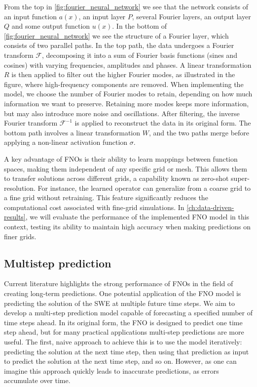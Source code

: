 From the top in \autoref{fig:fourier_neural_network} we see that the network consists of an input function $a(x)$, an input layer $P$, several Fourier layers, an output layer $Q$ and some output function $u(x)$.
In the bottom of \autoref{fig:fourier_neural_network} we see the structure of a Fourier layer, which consists of two parallel paths.
In the top path, the data undergoes a Fourier transform $\mathcal{F}$, decomposing it into a sum of Fourier basis functions (sines and cosines) with varying frequencies, amplitudes and phases.
A linear transformation $R$ is then applied to filter out the higher Fourier modes, as illustrated in the figure, where high-frequency components are removed.
When implementing the model, we choose the number of Fourier modes to retain, depending on how much information we want to preserve.
Retaining more modes keeps more information, but may also introduce more noise and oscillations.
After filtering, the inverse Fourier transform $\mathcal{F}^{-1}$ is applied to reconstruct the data in its original form.
The bottom path involves a linear transformation $W$, and the two paths merge before applying a non-linear activation function $\sigma$.

A key advantage of FNOs is their ability to learn mappings between function spaces, making them independent of any specific grid or mesh.
This allows them to transfer solutions across different grids, a capability known as zero-shot super-resolution.
For instance, the learned operator can generalize from a coarse grid to a fine grid without retraining.
This feature significantly reduces the computational cost associated with fine-grid simulations.
In \autoref{ch:data-driven-results}, we will evaluate the performance of the implemented FNO model in this context, testing its ability to maintain high accuracy when making predictions on finer grids.

\subsection*{Multistep prediction}
Current literature highlights the strong performance of FNOs in the field of creating long-term predictions.
One potential application of the FNO model is predicting the solution of the SWE at multiple future time steps.
We aim to develop a multi-step prediction model capable of forecasting a specified number of time steps ahead.
In its original form, the FNO is designed to predict one time step ahead, but for many practical applications multi-step predictions are more useful.
The first, naive approach to achieve this is to use the model iteratively: predicting the solution at the next time step, then using that prediction as input to predict the solution at the next time step, and so on.
However, as one can imagine this approach quickly leads to inaccurate predictions, as errors accumulate over time.

